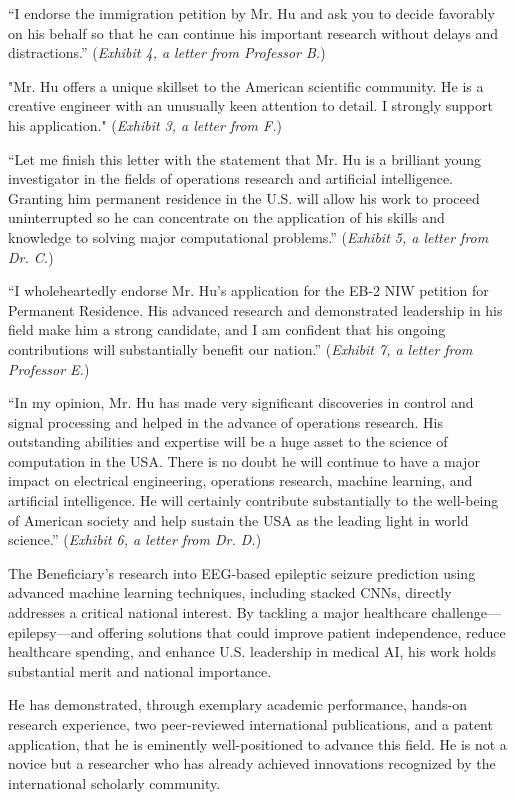 \documentclass{article}
\begin{document}
“I endorse the immigration petition by Mr. Hu and ask you to decide favorably on his behalf so that he can continue his important research without delays and distractions.” ({\it Exhibit 4, a letter from Professor B.}) 

"Mr. Hu offers a unique skillset to the American scientific community. He is a creative engineer with an unusually keen attention to detail. I strongly support his application." ({\it Exhibit 3, a letter from F.}) 

“Let me finish this letter with the statement that Mr. Hu is a brilliant young investigator in the fields of operations research and artificial intelligence. Granting him permanent residence in the U.S. will allow his work to proceed uninterrupted so he can concentrate on the application of his skills and knowledge to solving major computational problems.” ({\it Exhibit 5, a letter from Dr. C.}) 

“I wholeheartedly endorse Mr. Hu's application for the EB-2 NIW petition for Permanent Residence. His advanced research and demonstrated leadership in his field make him a strong candidate, and I am confident that his ongoing contributions will substantially benefit our nation.” ({\it Exhibit 7, a letter from Professor E.}) 

“In my opinion, Mr. Hu has made very significant discoveries in control and signal processing and helped in the advance of operations research. His outstanding abilities and expertise will be a huge asset to the science of computation in the USA. There is no doubt he will continue to have a major impact on electrical engineering, operations research, machine learning, and artificial intelligence. He will certainly contribute substantially to the well-being of American society and help sustain the USA as the leading light in world science.” ({\it Exhibit 6, a letter from Dr. D.}) 

The Beneficiary’s research into EEG-based epileptic seizure prediction using advanced machine learning techniques, including stacked CNNs, directly addresses a critical national interest. By tackling a major healthcare challenge—epilepsy—and offering solutions that could improve patient independence, reduce healthcare spending, and enhance U.S. leadership in medical AI, his work holds substantial merit and national importance.

He has demonstrated, through exemplary academic performance, hands-on research experience, two peer-reviewed international publications, and a patent application, that he is eminently well-positioned to advance this field. He is not a novice but a researcher who has already achieved innovations recognized by the international scholarly community.
\end{document}
